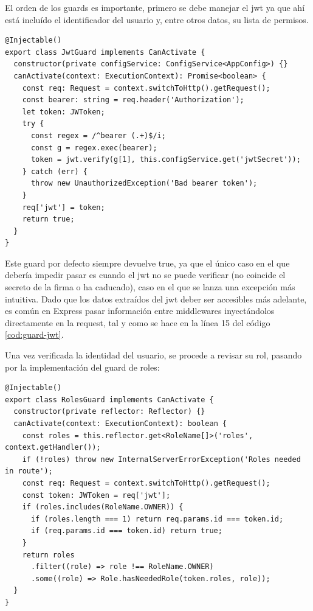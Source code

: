 \clearpage
El orden de los guards es importante, primero se debe manejar el jwt ya que ahí está incluído el identificador del usuario y, entre otros datos, su lista de permisos.
\begin{lstlisting}[caption={Guard JWT: Verificación de un json web token e inyección de datos en la request},label=cod:guard-jwt]
@Injectable()
export class JwtGuard implements CanActivate {
  constructor(private configService: ConfigService<AppConfig>) {}
  canActivate(context: ExecutionContext): Promise<boolean> {
    const req: Request = context.switchToHttp().getRequest();
    const bearer: string = req.header('Authorization');
    let token: JWToken;
    try {
      const regex = /^bearer (.+)$/i;
      const g = regex.exec(bearer);
      token = jwt.verify(g[1], this.configService.get('jwtSecret'));
    } catch (err) {
      throw new UnauthorizedException('Bad bearer token');
    }
    req['jwt'] = token;
    return true;
  }
}
\end{lstlisting}
\vspace{1em}
\par Este guard por defecto siempre devuelve true, ya que el único caso en el que debería impedir pasar es cuando el jwt no se puede verificar (no coincide el secreto de la firma o ha caducado), caso en el que se lanza una excepción más intuitiva. Dado que los datos extraídos del jwt deber ser accesibles más adelante, es común en Express pasar información entre middlewares inyectándolos directamente en la request, tal y como se hace en la línea 15 del código \ref{cod:guard-jwt}.
\vspace{1em}
\par Una vez verificada la identidad del usuario, se procede a revisar su rol, pasando por la implementación del guard de roles:
\begin{lstlisting}[caption={Guard Roles: Verificación de roles necesarios para el acceso},label=cod:guard-roles]
@Injectable()
export class RolesGuard implements CanActivate {
  constructor(private reflector: Reflector) {}
  canActivate(context: ExecutionContext): boolean {
    const roles = this.reflector.get<RoleName[]>('roles', context.getHandler());
    if (!roles) throw new InternalServerErrorException('Roles needed in route');
    const req: Request = context.switchToHttp().getRequest();
    const token: JWToken = req['jwt'];
    if (roles.includes(RoleName.OWNER)) {
      if (roles.length === 1) return req.params.id === token.id;
      if (req.params.id === token.id) return true;
    }
    return roles
      .filter((role) => role !== RoleName.OWNER)
      .some((role) => Role.hasNeededRole(token.roles, role));
  }
}
\end{lstlisting}
